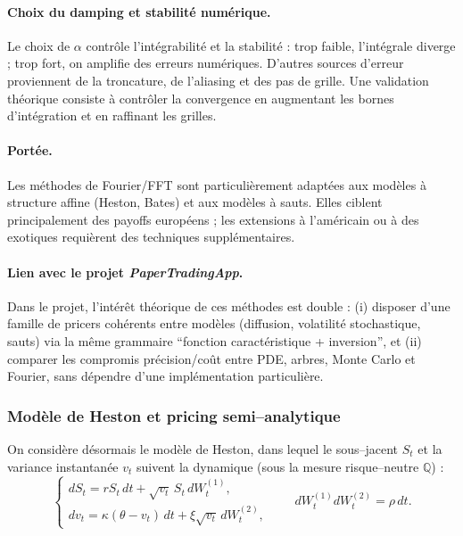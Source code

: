 \documentclass[11pt,a4paper]{article}
\newcommand{\1}{\mathbf{1}}
\begin{document}
\paragraph{Choix du damping et stabilit\'e num\'erique.}
Le choix de $\alpha$ contr\^ole l'int\'egrabilit\'e et la stabilit\'e : trop faible, l'int\'egrale diverge ; trop fort,
on amplifie des erreurs num\'eriques. D'autres sources d'erreur proviennent de la troncature, de l'aliasing et des pas de grille.
Une validation th\'eorique consiste \`a contr\^oler la convergence en augmentant les bornes d'int\'egration et en raffinant les grilles.

\paragraph{Port\'ee.}
Les m\'ethodes de Fourier/FFT sont particuli\`erement adapt\'ees aux mod\`eles \`a structure affine (Heston, Bates) et aux mod\`eles \`a sauts.
Elles ciblent principalement des payoffs europ\'eens ; les extensions \`a l'am\'ericain ou \`a des exotiques requi\`erent des techniques suppl\'ementaires.

\paragraph{Lien avec le projet \emph{PaperTradingApp}.}
Dans le projet, l'int\'er\^et th\'eorique de ces m\'ethodes est double : (i) disposer d'une famille de pricers coh\'erents entre mod\`eles (diffusion,
volatilité stochastique, sauts) via la m\^eme grammaire ``fonction caract\'eristique + inversion'', et (ii) comparer les compromis pr\'ecision/co\^ut
entre PDE, arbres, Monte Carlo et Fourier, sans d\'ependre d'une impl\'ementation particuli\`ere.

\noindent
\subsubsection{Mod\`ele de Heston et pricing semi--analytique}

On consid\`ere d\'esormais le mod\`ele de Heston, dans lequel le sous--jacent $S_t$ et
la variance instantan\'ee $v_t$ suivent la dynamique (sous la mesure risque--neutre $\mathbb{Q}$) :
\[
\begin{cases}
dS_t = r S_t \, dt + \sqrt{v_t}\, S_t \, dW_t^{(1)}, \\[4pt]
dv_t = \kappa(\theta - v_t)\, dt + \xi \sqrt{v_t} \, dW_t^{(2)},
\end{cases}
\qquad
dW_t^{(1)} dW_t^{(2)} = \rho\, dt.
\]
\end{document}

